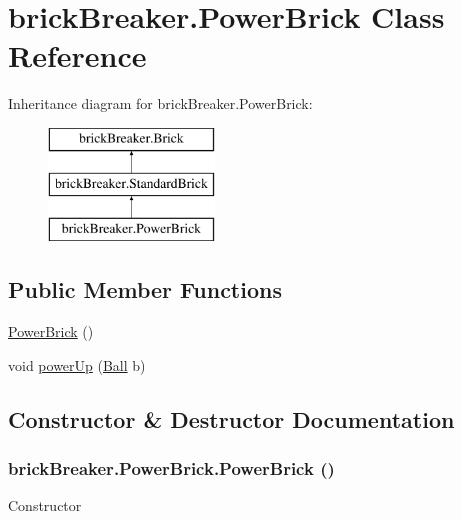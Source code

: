 \hypertarget{classbrick_breaker_1_1_power_brick}{
\section{brickBreaker.PowerBrick Class Reference}
\label{classbrick_breaker_1_1_power_brick}
}
Inheritance diagram for brickBreaker.PowerBrick:\begin{figure}[H]
\begin{center}
\leavevmode
\includegraphics[height=3cm]{classbrick_breaker_1_1_power_brick}
\end{center}
\end{figure}
\subsection*{Public Member Functions}
\begin{DoxyCompactItemize}
\item 
\hyperlink{classbrick_breaker_1_1_power_brick_ab9512df794d4c4991067f9eb6c085399}{PowerBrick} ()
\item 
void \hyperlink{classbrick_breaker_1_1_power_brick_aa5f41bb48fc63ed441ec2e9892ccdac3}{powerUp} (\hyperlink{classbrick_breaker_1_1_ball}{Ball} b)
\end{DoxyCompactItemize}


\subsection{Constructor \& Destructor Documentation}
\hypertarget{classbrick_breaker_1_1_power_brick_ab9512df794d4c4991067f9eb6c085399}{
\subsubsection[{PowerBrick}]{\setlength{\rightskip}{0pt plus 5cm}brickBreaker.PowerBrick.PowerBrick ()}}
\label{classbrick_breaker_1_1_power_brick_ab9512df794d4c4991067f9eb6c085399}
Constructor 

